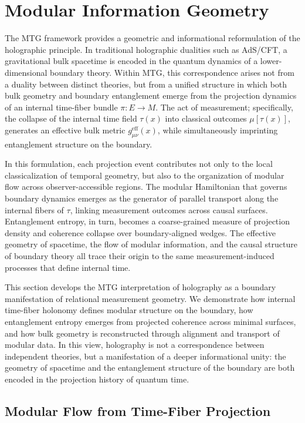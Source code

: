 \documentclass[11pt]{article}
\begin{document}
\section{Modular Information Geometry}\label{sec:8}
The MTG framework provides a geometric and informational reformulation of the holographic principle. In traditional holographic dualities such as AdS/CFT, a gravitational bulk spacetime is encoded in the quantum dynamics of a lower-dimensional boundary theory. Within MTG, this correspondence arises not from a duality between distinct theories, but from a unified structure in which both bulk geometry and boundary entanglement emerge from the projection dynamics of an internal time-fiber bundle \( \pi: E \to M \). The act of measurement; specifically, the collapse of the internal time field \( \tau(x) \) into classical outcomes \( \mu[\tau(x)] \), generates an effective bulk metric \( g^{\mathrm{eff}}_{\mu\nu}(x) \), while simultaneously imprinting entanglement structure on the boundary.

In this formulation, each projection event contributes not only to the local classicalization of temporal geometry, but also to the organization of modular flow across observer-accessible regions. The modular Hamiltonian that governs boundary dynamics emerges as the generator of parallel transport along the internal fibers of \( \tau \), linking measurement outcomes across causal surfaces. Entanglement entropy, in turn, becomes a coarse-grained measure of projection density and coherence collapse over boundary-aligned wedges. The effective geometry of spacetime, the flow of modular information, and the causal structure of boundary theory all trace their origin to the same measurement-induced processes that define internal time.

This section develops the MTG interpretation of holography as a boundary manifestation of relational measurement geometry. We demonstrate how internal time-fiber holonomy defines modular structure on the boundary, how entanglement entropy emerges from projected coherence across minimal surfaces, and how bulk geometry is reconstructed through alignment and transport of modular data. In this view, holography is not a correspondence between independent theories, but a manifestation of a deeper informational unity: the geometry of spacetime and the entanglement structure of the boundary are both encoded in the projection history of quantum time.


\subsection{Modular Flow from Time-Fiber Projection}
\end{document}
